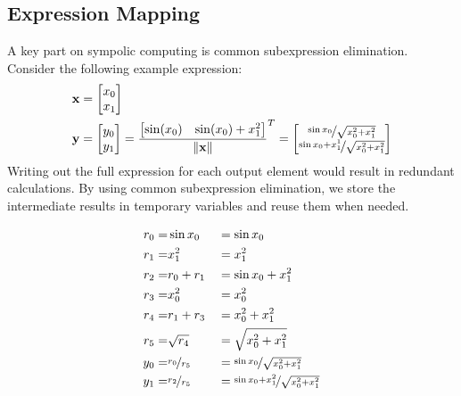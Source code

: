 \subsection{Expression Mapping}
A key part on sympolic computing is common subexpression elimination.
Consider the following example expression:
\begin{align}
     & \mathbf{x} = \begin{bmatrix}x_0 \\ x_1\end{bmatrix}  \\
     & \mathbf{y} =  \begin{bmatrix}y_0 \\ y_1\end{bmatrix}
    =\frac{\begin{bmatrix}\sin(x_0) & \sin(x_0)+x_1^2\end{bmatrix}}{\left\Vert \mathbf{x} \right\Vert}^T
    =  \begin{bmatrix}
           \nicefrac{\sin x_0}{\sqrt{x_0^2+x_1^2}} \\
           \nicefrac{\sin x_0+x_1^1}{\sqrt{x_0^2+x_1^2}}
       \end{bmatrix}
\end{align}
Writing out the full expression for each output element would result in redundant calculations.
By using common subexpression elimination, we store the intermediate results in temporary variables and reuse them when needed.

\begin{align*}
    r_0 = & \sin x_0            &  & = \sin x_0                                     \\
    r_1 = & x_1^2               &  & =x_1^2                                         \\
    r_2 = & r_0+r_1             &  & =\sin x_0+x_1^2                                \\
    r_3 = & x_0^2               &  & =x_0^2                                         \\
    r_4 = & r_1+r_3             &  & =x_0^2+x_1^2                                   \\
    r_5 = & \sqrt{r_4}          &  & =\sqrt{x_0^2+x_1^2}                            \\
    y_0 = & \nicefrac{r_0}{r_5} &  & =\nicefrac{\sin x_0}{\sqrt{x_0^2+x_1^2}}       \\
    y_1 = & \nicefrac{r_2}{r_5} &  & =\nicefrac{\sin x_0+x_1^2}{\sqrt{x_0^2+x_1^2}} \\
\end{align*}



